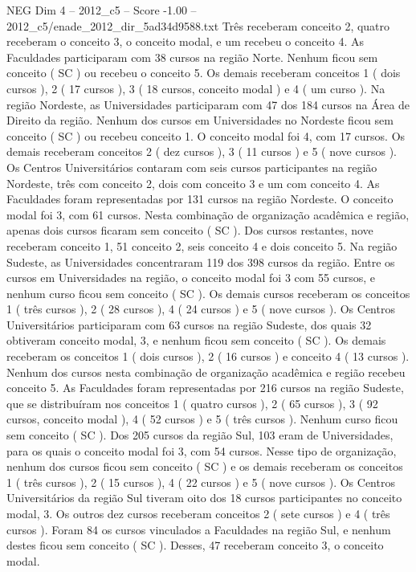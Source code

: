 \begin{textsample}{NEG Dim 4 – 2012\_c5 – Score -1.00 – 2012\_c5/enade\_2012\_dir\_5ad34d9588.txt}
Três receberam conceito 2, quatro receberam o conceito 3, o conceito modal, e um recebeu o conceito 4.
As Faculdades participaram com 38 cursos na região Norte.
Nenhum ficou sem conceito ( SC ) ou recebeu o conceito 5.
Os demais receberam conceitos 1 ( dois cursos ), 2 ( 17 cursos ), 3 ( 18 cursos, conceito modal ) e 4 ( um curso ).
Na região Nordeste, as Universidades participaram com 47 dos 184 cursos na Área de Direito da região.
Nenhum dos cursos em Universidades no Nordeste ficou sem conceito ( SC ) ou recebeu conceito 1.
O conceito modal foi 4, com 17 cursos.
Os demais receberam conceitos 2 ( dez cursos ), 3 ( 11 cursos ) e 5 ( nove cursos ).
Os Centros Universitários contaram com seis cursos participantes na região Nordeste, três com conceito 2, dois com conceito 3 e um com conceito 4.
As Faculdades foram representadas por 131 cursos na região Nordeste.
O conceito modal foi 3, com 61 cursos.
Nesta combinação de organização acadêmica e região, apenas dois cursos ficaram sem conceito ( SC ).
Dos cursos restantes, nove receberam conceito 1, 51 conceito 2, seis conceito 4 e dois conceito 5.
Na região Sudeste, as Universidades concentraram 119 dos 398 cursos da região.
Entre os cursos em Universidades na região, o conceito modal foi 3 com 55 cursos, e nenhum curso ficou sem conceito ( SC ).
Os demais cursos receberam os conceitos 1 ( três cursos ), 2 ( 28 cursos ), 4 ( 24 cursos ) e 5 ( nove cursos ).
Os Centros Universitários participaram com 63 cursos na região Sudeste, dos quais 32 obtiveram conceito modal, 3, e nenhum ficou sem conceito ( SC ).
Os demais receberam os conceitos 1 ( dois cursos ), 2 ( 16 cursos ) e conceito 4 ( 13 cursos ).
Nenhum dos cursos nesta combinação de organização acadêmica e região recebeu conceito 5.
As Faculdades foram representadas por 216 cursos na região Sudeste, que se distribuíram nos conceitos 1 ( quatro cursos ), 2 ( 65 cursos ), 3 ( 92 cursos, conceito modal ), 4 ( 52 cursos ) e 5 ( três cursos ).
Nenhum curso ficou sem conceito ( SC ).
Dos 205 cursos da região Sul, 103 eram de Universidades, para os quais o conceito modal foi 3, com 54 cursos.
Nesse tipo de organização, nenhum dos cursos ficou sem conceito ( SC ) e os demais receberam os conceitos 1 ( três cursos ), 2 ( 15 cursos ), 4 ( 22 cursos ) e 5 ( nove cursos ).
Os Centros Universitários da região Sul tiveram oito dos 18 cursos participantes no conceito modal, 3.
Os outros dez cursos receberam conceitos 2 ( sete cursos ) e 4 ( três cursos ).
Foram 84 os cursos vinculados a Faculdades na região Sul, e nenhum destes ficou sem conceito ( SC ).
Desses, 47 receberam conceito 3, o conceito modal.

\end{textsample}

